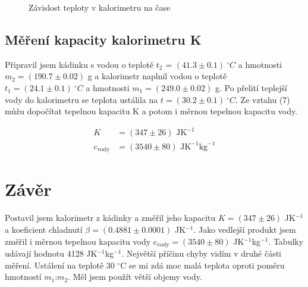 \documentclass[a4paper,11pt]{article}
\begin{document}
\begin{figure}[htpb]
  \centering
  
  \caption{Závislost teploty v kalorimetru na čase}
\end{figure}

\subsection{Měření kapacity kalorimetru K}

Připravil jsem kádinku s vodou o teplotě $t_2$ = $ (41.3 \pm 0.1)\ ^{\circ}C$ a hmotnosti $m_2 = (190.7 \pm 0.02)$ g a kalorimetr naplnil vodou o teplotě $t_1 = (24.1 \pm 0.1)\ ^{\circ}C$ a hmotnosti $m_1 = (249.0 \pm 0.02)$ g. Po přelití teplejší vody do kalorimetru se teplota ustálila na $t=(30.2 \pm 0.1)\ ^{\circ}C$. Ze vztahu (7) můžu dopočítat tepelnou kapacitu K a potom i měrnou tepelnou kapacitu vody.

\begin{align}
  K &= (347 \pm 26) \text{ JK}^{-1} \\
  c_{\text{vody}} &=  (3540 \pm 80) \text{ JK}^{-1}\text{kg}^{-1}
\end{align}

\section{Závěr}

Postavil jsem kalorimetr z kádinky a změřil jeho kapacitu $K = (347 \pm 26)$ JK$^{-1}$ a koeficient chladnutí $\beta = (0.4881 \pm 0.0001)$ JK$^{-1}$. Jako vedlejší produkt jsem změřil i měrnou tepelnou kapacitu vody $c_{\text{vody}} = (3540 \pm 80)$ JK$^{-1}$kg$^{-1}$. Tabulky udávají hodnotu 4128 JK$^{-1}$kg$^{-1}$. Největší příčinu chyby vidím v druhé části měření. Ustálení na teplotě 30 $^{\circ}$C se mi zdá moc malá teplota oproti poměru hmotností $m_1$:$m_2$. Měl jsem použít větší objemy vody.
\end{document}
